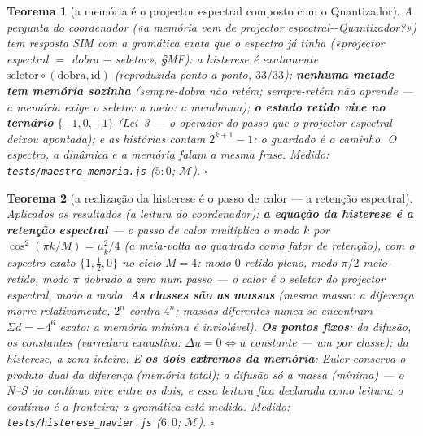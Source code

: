 \documentclass[11pt,a4paper]{article}
\newtheorem{teorema}{Teorema}
\newcommand{\code}[1]{\texttt{\small #1}}
\begin{document}
\begin{teorema}[a memória é o projector espectral composto com o Quantizador]\label{thm:maestro-memoria}
A pergunta do coordenador («a memória vem de projector espectral$+$Quantizador?»)
tem resposta SIM com a gramática exata que o espectro já tinha
(«projector espectral $=$ dobra $+$ seletor», \S MF): a histerese é
\emph{exatamente} $\mathrm{seletor}\circ(\mathrm{dobra},\mathrm{id})$
(reproduzida ponto a ponto, $33/33$); \textbf{nenhuma metade tem
memória sozinha} (sempre-dobra não retém; sempre-retém não aprende —
a memória exige o seletor \emph{a meio}: a membrana); \textbf{o
estado retido vive no ternário} $\{-1,0,+1\}$ (Lei~3 — o operador do passo que o
projector espectral deixou apontada); e as histórias contam $2^{k+1}-1$: \emph{o
guardado é o caminho}. O espectro, a dinâmica e a memória falam a
mesma frase.
\emph{Medido:} \code{tests/maestro\_memoria.js} ($5{:}0$; $\mathcal{M}$).
$\square$
\end{teorema}

\begin{teorema}[a realização da histerese é o passo de calor --- a
retenção espectral]\label{thm:histerese-navier}
Aplicados os resultados (a leitura do coordenador): \textbf{a equação
da histerese é a retenção espectral} --- o passo de calor multiplica o
modo $k$ por $\cos^{2}(\pi k/M)=\mu_{k}^{2}/4$ (a meia-volta ao
quadrado como fator de retenção), com o espectro exato $\{1,\frac12,0\}$
no ciclo $M{=}4$: modo $0$ retido pleno, modo $\pi/2$ meio-retido,
modo $\pi$ \emph{dobrado a zero num passo} — o calor é o seletor do
projector espectral, modo a modo. \textbf{As classes são as massas} (mesma massa:
a diferença morre relativamente, $2^{n}$ contra $4^{n}$; massas
diferentes \emph{nunca} se encontram — $\Sigma d=-4^{6}$ exato: a
memória mínima é inviolável). \textbf{Os pontos fixos}: da difusão,
os constantes (varredura exaustiva: $\Delta u=0\iff u$ constante —
um por classe); da histerese, a zona inteira. E \textbf{os dois
extremos da memória}: Euler conserva o produto dual da diferença
(memória total); a difusão só a massa (mínima) — o N--S do contínuo
vive entre os dois, e essa leitura fica \emph{declarada como leitura}:
o contínuo é a fronteira; a gramática está medida.
\emph{Medido:} \code{tests/histerese\_navier.js} ($6{:}0$;
$\mathcal{M}$).
$\square$
\end{teorema}
\end{document}
